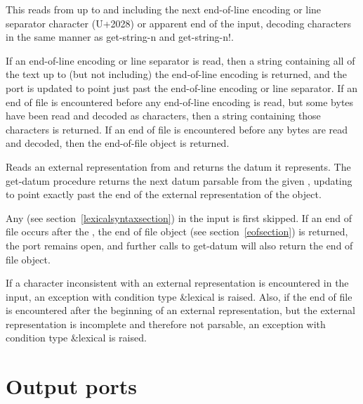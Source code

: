 \begin{entry}{%
}
   
This reads from  up to and including the next
end-of-line encoding or line separator character (U+2028) or apparent
end of the input, decoding characters in the same manner as {\cf
  get-string-n} and {\cf get-string-n!}.
   
If an end-of-line encoding or line separator is read, then a string
containing all of the text up to (but not including) the end-of-line
encoding is returned, and the port is updated to point just past the
end-of-line encoding or line separator. If an end of file is
encountered before any end-of-line encoding is read, but some bytes
have been read and decoded as characters, then a string containing
those characters is returned. If an end of file is encountered before
any bytes are read and decoded, then the end-of-file object is
returned.
\end{entry}

\begin{entry}{%
}
 
Reads an external representation from  and returns the
datum it represents.  The {\cf get-datum} procedure returns the next
datum parsable from the given , updating
 to point exactly past the end of the external
representation of the object.

Any  (see section~\ref{lexicalsyntaxsection}) in
the input is first skipped.  If an end of file occurs after the
, the end of file object (see
section~\ref{eofsection}) is returned, the port remains open, and
further calls to {\cf get-datum} will also return the end of file
object.

If a character inconsistent with an external representation is
encountered in the input, an exception with condition type
{\cf\&lexical} is raised.  Also, if the end of file is encountered
after the beginning of an external representation, but the external
representation is incomplete and therefore not parsable, an exception
with condition type {\cf\&lexical} is raised.
\end{entry}

\section{Output ports}

